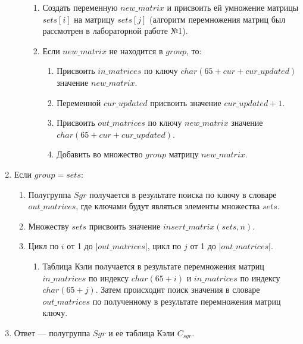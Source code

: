 \documentclass[bachelor, och, labwork]{shiza}
\begin{document}
\begin{enumerate}
\begin{enumerate}
                \begin{enumerate}
                    \item Создать переменную $new\_matrix$ и присвоить ей умножение
                    матрицы $sets[i]$ на матрицу $sets[j]$ (алгоритм перемножения
                    матриц был рассмотрен в лабораторной работе №1).
                    \item Если $new\_matrix$ не находится в $group$, то:
                        \begin{enumerate}
                            \item Присвоить $in\_matrices$ по ключу $char(65 + cur + cur\_updated)$ 
                            значение $new\_matrix$.
                            \item Переменной $cur\_updated$ присвоить значение $cur\_updated+1$.
                            \item Присвоить $out\_matrices$ по ключу $new\_matrix$ 
                            значение $char(65 + cur + cur\_updated)$.
                            \item Добавить во множество $group$ матрицу $new\_matrix$.
                        \end{enumerate}
                \end{enumerate}
        \end{enumerate}
    \item Если $group = sets$:
        \begin{enumerate}
            \item Полугруппа $Sgr$ получается в результате поиска по ключу в словаре 
            $out\_matrices$, где ключами будут являться элементы множества $sets$.
            \item Множеству $sets$ присвоить значение $insert\_matrix(sets, n)$.
            \item Цикл по $i$ от 1 до $|out\_matrices|$, цикл по $j$ от 1 до $|out\_matrices|$.
                \begin{enumerate}
                    \item Таблица Кэли получается в результате перемножения матриц $in\_matrices$
                    по индексу $char(65 + i)$ и $in\_matrices$ по индексу $char(65 + j)$.
                    Затем происходит поиск значения в словаре $out\_matrices$ по 
                    полученному в результате перемножения матриц ключу. 
                \end{enumerate}
        \end{enumerate}
    \item Ответ --- полугруппа $Sgr$ и ее таблица Кэли $C_{sgr}$.
\end{enumerate}
\end{document}
